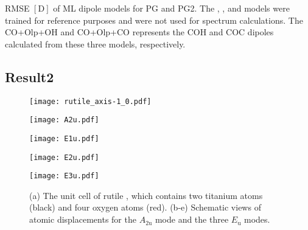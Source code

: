 \documentclass[luatex,twocolumn,showpacs,aps,prb,reprint,amsfonts,amsmath,amssymb,floatfix,groupedaddress, longbibliography]{revtex4-2}
\begin{document}

\begin{table}[tb] %
\centering
\caption{RMSE $[\mathrm{D}]$ of \ac{ML} dipole models for \ac{PG} and PG2. The , , and  models were trained for reference purposes and were not used for spectrum calculations. The CO+Olp+OH and CO+Olp+CO represents the COH and COC dipoles calculated from these three models, respectively.}
\label{table:rmse}
\end{table}

\subsection{Result2}\label{subsec:result2}

\lipsum[1-5]

\begin{figure}[t]
\hfill
\centering
\begin{subcaptionblock}{0.6\linewidth}
\centering
\texttt{[image: rutile\_axis-1\_0.pdf]}
\subcaption{}
\end{subcaptionblock}\hfill
\begin{subcaptionblock}{0.4\linewidth}
\centering
\texttt{[image: A2u.pdf]}
\end{subcaptionblock}\hfill
\begin{subcaptionblock}{0.3\linewidth}
\centering
\texttt{[image: E1u.pdf]}
\end{subcaptionblock}\hfill
\begin{subcaptionblock}{0.3\linewidth}
\centering
\texttt{[image: E2u.pdf]}
\end{subcaptionblock}\hfill
\begin{subcaptionblock}{0.3\linewidth}
\centering
\texttt{[image: E3u.pdf]}
\end{subcaptionblock}\hfill
\caption{(a) The unit cell of rutile , which contains two titanium atoms (black) and four oxygen atoms (red). (b-e) Schematic views of atomic displacements for the $A_{\mathrm{2u}}$ mode and the three $E_{\mathrm{u}}$ modes. }
\label{fig:crystal}
\end{figure}
\end{document}
